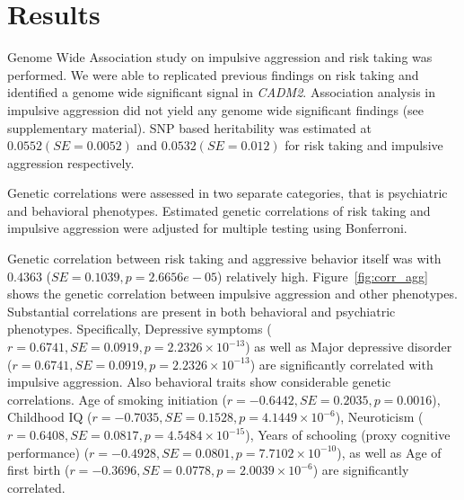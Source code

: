 
\section*{Results}
\label{sec:results}

Genome Wide Association study on impulsive aggression and risk taking was performed.
We were able to replicated previous findings on risk taking and identified a genome wide significant signal in \textit{CADM2}.
Association analysis in impulsive aggression did not yield any genome wide significant findings (see supplementary material).
SNP based heritability was estimated at $0.0552 (SE=0.0052)$ and $0.0532 (SE=0.012)$ for risk taking and impulsive aggression respectively.

Genetic correlations were assessed in two separate categories, that is psychiatric and behavioral phenotypes.
Estimated genetic correlations of risk taking and impulsive aggression were adjusted for multiple testing using Bonferroni.





Genetic correlation between risk taking and aggressive behavior itself was with $0.4363$ ($SE=0.1039,p=2.6656e-05$) relatively high. 
Figure~\ref{fig:corr_agg} shows the genetic correlation between impulsive aggression and other phenotypes.
Substantial correlations are present in both behavioral and psychiatric phenotypes.
Specifically,
Depressive symptoms ($r=0.6741, SE=0.0919, p=\ensuremath{2.2326\times 10^{-13}}$)
as well as
Major depressive disorder ($r=0.6741, SE=0.0919, p=\ensuremath{2.2326\times 10^{-13}}$)
are significantly correlated with impulsive aggression.
Also behavioral traits show considerable genetic correlations.
Age of smoking initiation ($r=\ensuremath{-0.6442}, SE=0.2035, p=0.0016$),
Childhood IQ ($r=\ensuremath{-0.7035}, SE=0.1528, p=\ensuremath{4.1449\times 10^{-6}}$),
Neuroticism ($r=0.6408, SE=0.0817, p=\ensuremath{4.5484\times 10^{-15}}$),
Years of schooling (proxy cognitive performance) ($r=\ensuremath{-0.4928}, SE=0.0801, p=\ensuremath{7.7102\times 10^{-10}}$),
as well as
Age of first birth ($r=\ensuremath{-0.3696}, SE=0.0778, p=\ensuremath{2.0039\times 10^{-6}}$) are significantly correlated.

